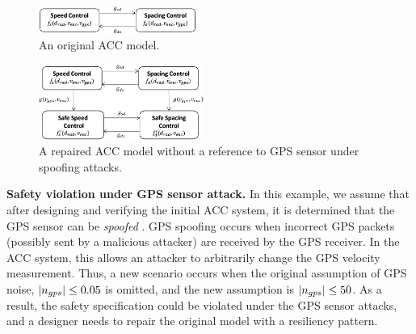 %
%
%
\begin{figure}[t!]%
	\centering%
		\includegraphics[width=0.46\textwidth]{image/acc_abstract_model}%
		\vspace{-0.5em}
	\caption{An original ACC model.}%
	\vspace{-1em}
\end{figure}%
\begin{figure}[t!]%
	\centering%
		\includegraphics[width=0.48\textwidth]{image/acc_abstract_model_pat1}%
		\vspace{-0.5em}
	\caption{A repaired ACC model without a reference to GPS sensor under spoofing attacks.}%
	\vspace{-1em}
\end{figure}%


\vspace{0.5em}
\noindent
{\bf Safety violation under GPS sensor attack.}
%
%
In this example, we assume that after designing and verifying the initial ACC system, it is determined that the GPS sensor can be \emph{spoofed} \cite{tippenhauer2011requirements, kerns2014unmanned}. GPS spoofing occurs when incorrect GPS packets (possibly sent by a malicious attacker) are received by the GPS receiver. In the ACC system, this allows an attacker to arbitrarily change the GPS velocity measurement. 
%
Thus, a new scenario occurs when the original assumption of GPS noise, \eg $|n_{gps}| \leq 0.05$ is omitted, and the new assumption is $|n_{gps}| \leq 50$.
As a result, the safety specification could be violated under the GPS sensor attacks, and a designer needs to repair the original model with a resiliency pattern. 




